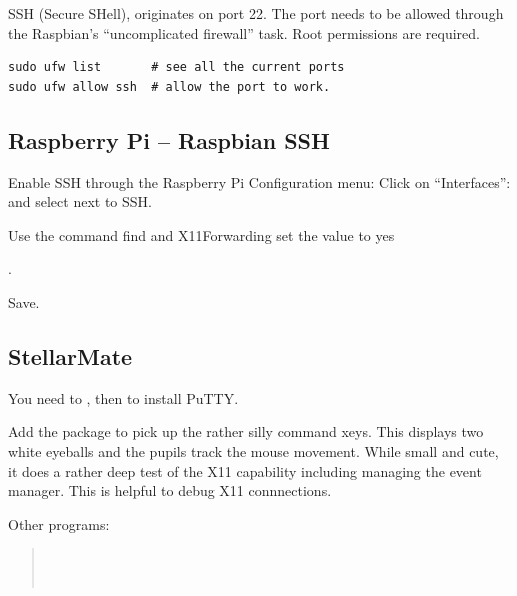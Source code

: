 SSH (Secure SHell), originates on port 22. The port needs to be allowed
through the Raspbian's ``uncomplicated firewall''  task. Root
permissions are required.

\begingroup \fontsize{10pt}{10pt}
\selectfont
\begin{verbatim} 
sudo ufw list       # see all the current ports
sudo ufw allow ssh  # allow the port to work.
\end{verbatim}
\endgroup

\subsection{Raspberry Pi -- Raspbian SSH}

Enable SSH through the Raspberry Pi Configuration menu:
 Click on ``Interfaces'':
and select  next to SSH.

Use the command  find
and X11Forwarding set the value to yes 

.

Save.



\subsection{StellarMate} \label{sec:StellarMate}

You need to , then 
to install PuTTY.

Add the  package to pick up the rather silly command
xeys. This displays two white eyeballs and the pupils track the mouse
movement. While small and cute, it does a rather deep test of the X11
capability including managing the event manager. This is helpful
to debug X11 connnections.

\begin{quote}
\end{quote}

Other programs:
\begin{quote}
  \\
          \\ 
\end{quote}


